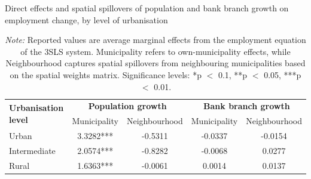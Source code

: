 \documentclass[a4paper,11pt,oneside]{article}
\begin{document}
{\begin{table}
\centering
\caption{Direct effects and spatial spillovers of population and bank branch growth on employment change, by level of urbanisation}
\label{tab:employment_spillovers}
\vspace{-2mm}

\begin{tabular}{lcccc}
\toprule
\multirow{2}{*}{\textbf{Urbanisation level}}
& \multicolumn{2}{c}{\textbf{Population growth}}
& \multicolumn{2}{c}{\textbf{Bank branch growth}} \\
\cmidrule(lr){2-3} \cmidrule(lr){4-5}
& Municipality & Neighbourhood
& Municipality & Neighbourhood \\
\midrule
Urban
& 3.3282***  & -0.5311
& -0.0337    & -0.0154 \\
Intermediate
& 2.0574***  & -0.8282
& -0.0068    & 0.0277 \\
Rural
& 1.6363***  & -0.0061
& 0.0014     & 0.0137 \\
\bottomrule
\end{tabular}

\vspace{0.2cm}
\caption*{\footnotesize
\textsl{Note:} Reported values are average marginal effects from the employment equation of the 3SLS system.
Municipality refers to own-municipality effects, while Neighbourhood captures spatial spillovers from neighbouring municipalities based on the spatial weights matrix.
Significance levels: *p $<$ 0.1, **p $<$ 0.05, ***p $<$ 0.01.}
\end{table}



\pagebreak
\clearpage



}
\end{document}
